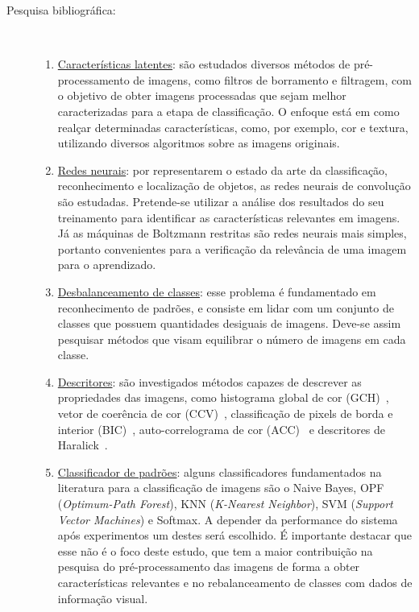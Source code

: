 \begin{description}
 \item[Pesquisa bibliográfica:] \
 
  \begin{enumerate}
\item \underline{Características latentes}: são estudados diversos métodos de pré-processamento de imagens, como filtros de borramento e filtragem, com o objetivo de obter imagens processadas que sejam melhor caracterizadas para a etapa de classificação. O enfoque está em como realçar determinadas características, como, por exemplo, cor e textura, utilizando diversos algoritmos sobre as imagens originais.

\item \underline{Redes neurais}: por representarem o estado da arte da classificação, reconhecimento e localização de objetos, as redes neurais de convolução são estudadas. Pretende-se utilizar a análise dos resultados do seu treinamento para identificar as características relevantes em imagens. Já as máquinas de Boltzmann restritas são redes neurais mais simples, portanto convenientes para a verificação da relevância de uma imagem para o aprendizado.

\item \underline{Desbalanceamento de classes}: esse problema é fundamentado em reconhecimento de padrões, e consiste em lidar com um conjunto de classes que possuem quantidades desiguais de imagens. Deve-se assim pesquisar métodos que visam equilibrar o número de imagens em cada classe.
    
\item \underline{Descritores}: são investigados métodos capazes de descrever as propriedades das imagens, como histograma global de cor (GCH)~\cite{Gonzalez2007}, vetor de coerência de cor (CCV)~\cite{ccv}, classificação de pixels de borda e interior (BIC)~\cite{bic}, auto-correlograma de cor (ACC)~\cite{acc} e descritores de Haralick~\cite{Haralick1973}.

\item \underline{Classificador de padrões}: alguns classificadores fundamentados na literatura para a classificação de imagens são o Naive Bayes, OPF (\textit{Optimum-Path Forest}), KNN (\textit{K-Nearest Neighbor}), SVM (\textit{Support Vector Machines}) e Softmax. A depender da performance do sistema após experimentos um destes será escolhido. É importante destacar que esse não é o foco deste estudo, que tem a maior contribuição na pesquisa do pré-processamento das imagens de forma a obter características relevantes e no rebalanceamento de classes com dados de informação visual.
  \end{enumerate}


\end{description}
